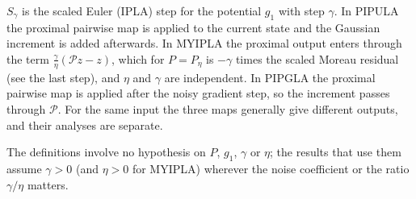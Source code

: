 \documentclass[11pt,a4paper]{report}
\begin{document}
\(S_\gamma\) is the scaled Euler (IPLA) step for the potential \(g_1\) with step \(\gamma\). In PIPULA the proximal pairwise map is applied to the current state and the Gaussian increment is added afterwards. In MYIPLA the proximal output enters through the term \(\frac\gamma\eta(\mathcal Pz-z)\), which for \(P=P_\eta\) is \(-\gamma\) times the scaled Moreau residual (see the last step), and \(\eta\) and \(\gamma\) are independent. In PIPGLA the proximal pairwise map is applied after the noisy gradient step, so the increment passes through \(\mathcal P\). For the same input the three maps generally give different outputs, and their analyses are separate.




The definitions involve no hypothesis on \(P\), \(g_1\), \(\gamma\) or \(\eta\); the results that use them assume \(\gamma>0\) (and \(\eta>0\) for MYIPLA) wherever the noise coefficient or the ratio \(\gamma/\eta\) matters.
\end{document}
